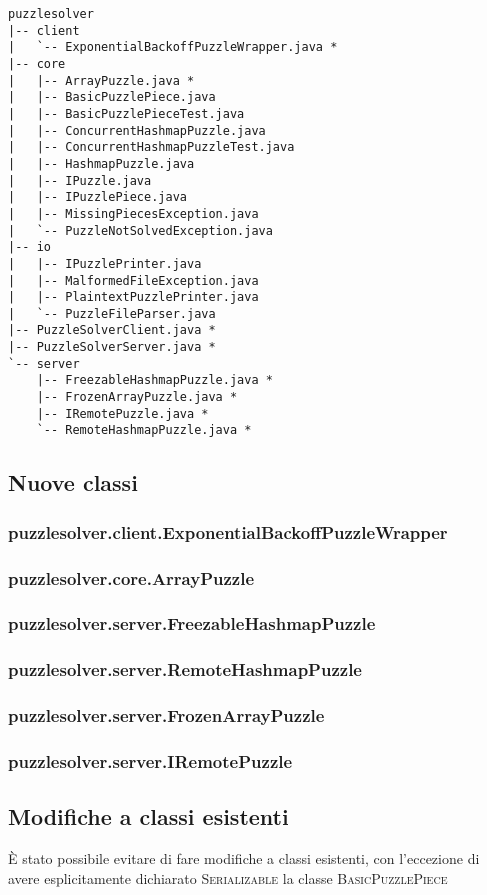 \documentclass[a4paper]{article}
\newcommand{\Classname}[1]{\textsc{#1}}
\newcommand{\Ifacename}[1]{\textsc{#1}}
\begin{document}
\begin{verbatim}
puzzlesolver
|-- client
|   `-- ExponentialBackoffPuzzleWrapper.java *
|-- core
|   |-- ArrayPuzzle.java *
|   |-- BasicPuzzlePiece.java
|   |-- BasicPuzzlePieceTest.java
|   |-- ConcurrentHashmapPuzzle.java
|   |-- ConcurrentHashmapPuzzleTest.java
|   |-- HashmapPuzzle.java
|   |-- IPuzzle.java
|   |-- IPuzzlePiece.java
|   |-- MissingPiecesException.java
|   `-- PuzzleNotSolvedException.java
|-- io
|   |-- IPuzzlePrinter.java
|   |-- MalformedFileException.java
|   |-- PlaintextPuzzlePrinter.java
|   `-- PuzzleFileParser.java
|-- PuzzleSolverClient.java *
|-- PuzzleSolverServer.java *
`-- server
    |-- FreezableHashmapPuzzle.java *
    |-- FrozenArrayPuzzle.java *
    |-- IRemotePuzzle.java *
    `-- RemoteHashmapPuzzle.java *
\end{verbatim}

\subsection{Nuove classi}
\subsubsection{puzzlesolver.client.ExponentialBackoffPuzzleWrapper}
\subsubsection{puzzlesolver.core.ArrayPuzzle}
\subsubsection{puzzlesolver.server.FreezableHashmapPuzzle}
\subsubsection{puzzlesolver.server.RemoteHashmapPuzzle}
\subsubsection{puzzlesolver.server.FrozenArrayPuzzle}
\subsubsection{puzzlesolver.server.IRemotePuzzle}

\subsection{Modifiche a classi esistenti}
\`E stato possibile evitare di fare modifiche a classi esistenti, con l'eccezione di avere esplicitamente dichiarato \Ifacename{Serializable} la classe \Classname{BasicPuzzlePiece}
\end{document}
